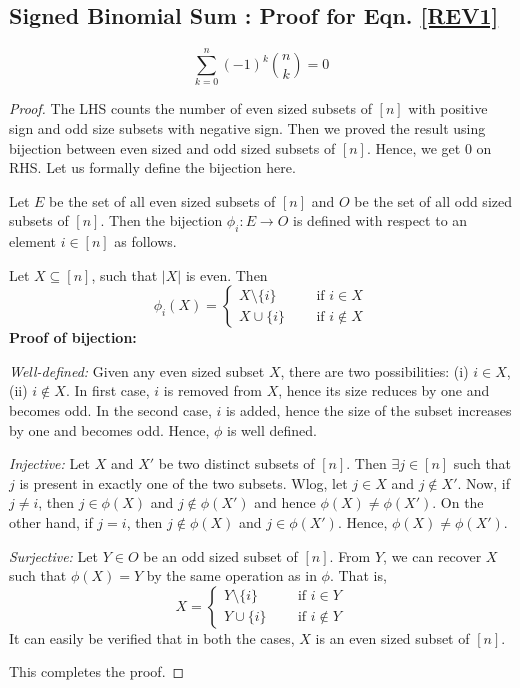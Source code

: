 \subsection{Signed Binomial Sum : Proof for Eqn. \eqref{REV1}} \label{subsec:identity-even-odd-1}
$$\sum_{k=0}^n (-1)^k{n\choose k} = 0$$
\begin{proof}
    The LHS counts the number of even sized subsets of $[n]$ with positive sign and odd size subsets with negative sign. Then we proved the result using bijection between even sized and odd sized subsets of $[n]$. Hence, we get 0 on RHS. Let us formally define the bijection here.
    
    Let $E$ be the set of all even sized subsets of $[n]$ and $O$ be the set of all odd sized subsets of $[n]$. Then the bijection  $\phi_i:E\rightarrow O$ is defined with respect to an element $i\in[n]$ as follows.
    
    Let $X\subseteq [n]$, such that $|X|$ is even. Then 
    \[
        \phi_i(X) = 
        \begin{cases}
            X\setminus \{i\} & ~~~~~\text{ if } i\in X\\
            X\cup\{i\} & ~~~~~\text{ if } i\not\in X
        \end{cases}
    \]
    \textbf{Proof of bijection:}
    \begin{description}
        \item \textit{Well-defined:} Given any even sized subset $X$, there are two possibilities: (i) $i\in X$, (ii) $i\not\in X$. In first case, $i$ is removed from $X$, hence its size reduces by one and becomes odd. In the second case, $i$ is added, hence the size of the subset increases by one and becomes odd. Hence, $\phi$ is well defined.
        \item \textit{Injective:} Let $X$ and $X'$ be two distinct subsets of $[n]$. Then $\exists j\in[n]$ such that $j$ is present in exactly one of the two subsets. Wlog, let $j\in X$ and $j\not\in X'$. Now, if $j\neq i$, then $j\in \phi(X)$ and $j\not\in \phi(X')$ and hence $\phi(X)\neq \phi(X')$. On the other hand, if $j=i$, then $j\not\in \phi(X)$ and $j\in \phi(X')$. Hence, $\phi(X)\neq \phi(X')$.  
        \item \textit{Surjective:} Let $Y\in O$ be an odd sized subset of $[n]$. From $Y$, we can recover $X$ such that $\phi(X) = Y$ by the same operation as in $\phi$. That is, 
        \[
        X= \begin{cases}
            Y\setminus \{i\} & ~~~~~\text{ if } i\in Y\\
            Y\cup\{i\} & ~~~~~\text{ if } i\not\in Y
        \end{cases}
        \]
        It can easily be verified that in both the cases, $X$ is an even sized subset of $[n]$.
    \end{description}
    This completes the proof.
\end{proof}
%
%
